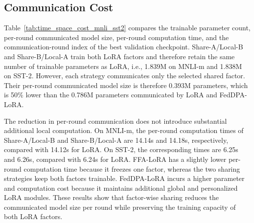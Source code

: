 \documentclass[lettersize,journal]{IEEEtran}
\begin{document}
		\subsection*{Communication Cost}
		{\color{black}Table~\ref{tab:time_space_cost_mnli_sst2} compares the trainable parameter count, per-round communicated model size, per-round computation time, and the communication-round index of the best validation checkpoint. Share-A/Local-B and Share-B/Local-A train both LoRA factors and therefore retain the same number of trainable parameters as LoRA, i.e., 1.839M on MNLI-m and 1.838M on SST-2. However, each strategy communicates only the selected shared factor. Their per-round communicated model size is therefore 0.393M parameters, which is 50\% lower than the 0.786M parameters communicated by LoRA and FedDPA-LoRA.
			
			The reduction in per-round communication does not introduce substantial additional local computation. On MNLI-m, the per-round computation times of Share-A/Local-B and Share-B/Local-A are 14.14s and 14.18s, respectively, compared with 14.12s for LoRA. On SST-2, the corresponding times are 6.25s and 6.26s, compared with 6.24s for LoRA. FFA-LoRA has a slightly lower per-round computation time because it freezes one factor, whereas the two sharing strategies keep both factors trainable. FedDPA-LoRA incurs a higher parameter and computation cost because it maintains additional global and personalized LoRA modules. These results show that factor-wise sharing reduces the communicated model size per round while preserving the training capacity of both LoRA factors.}
\end{document}
